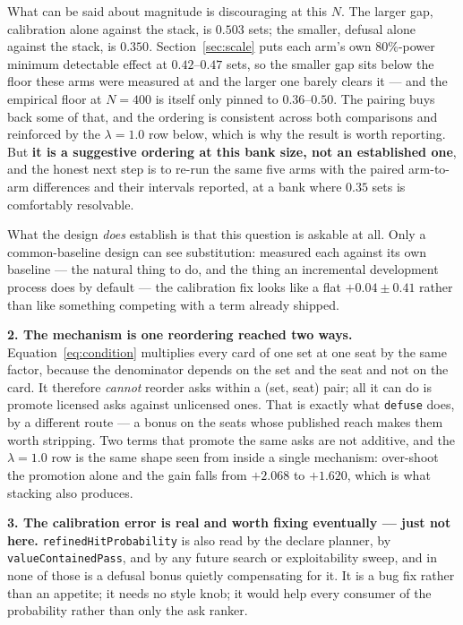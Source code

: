 \documentclass[11pt]{article}
\newcommand{\code}[1]{\texttt{#1}}
\begin{document}
What can be said about magnitude is discouraging at this $N$. The larger gap, calibration
alone against the stack, is $0.503$ sets; the smaller, defusal alone against the stack, is
$0.350$. Section~\ref{sec:scale} puts each arm's own $80\%$-power minimum detectable
effect at $0.42$--$0.47$ sets, so the smaller gap sits below the floor these arms were
measured at and the larger one barely clears it --- and the empirical floor at $N = 400$
is itself only pinned to $0.36$--$0.50$. The pairing buys back some of that, and the
ordering is consistent across both comparisons and reinforced by the $\lambda = 1.0$ row
below, which is why the result is worth reporting. But \textbf{it is a suggestive ordering
at this bank size, not an established one}, and the honest next step is to re-run the same
five arms with the paired arm-to-arm differences and their intervals reported, at a bank
where $0.35$ sets is comfortably resolvable.

What the design \emph{does} establish is that this question is askable at all. Only a
common-baseline design can see substitution: measured each against its own baseline --- the
natural thing to do, and the thing an incremental development process does by default ---
the calibration fix looks like a flat $+0.04 \pm 0.41$ rather than like something competing
with a term already shipped.

\textbf{2. The mechanism is one reordering reached two ways.} Equation~\eqref{eq:condition}
multiplies every card of one set at one seat by the same factor, because the denominator
depends on the set and the seat and not on the card. It therefore \emph{cannot} reorder
asks within a (set, seat) pair; all it can do is promote licensed asks against unlicensed
ones. That is exactly what \code{defuse} does, by a different route --- a bonus on the
seats whose published reach makes them worth stripping. Two terms that promote the same
asks are not additive, and the $\lambda = 1.0$ row is the same shape seen from inside a
single mechanism: over-shoot the promotion alone and the gain falls from $+2.068$ to
$+1.620$, which is what stacking also produces.

\textbf{3. The calibration error is real and worth fixing eventually --- just not here.}
\code{refinedHitProbability} is also read by the declare planner, by
\code{valueContainedPass}, and by any future search or exploitability sweep, and in none of
those is a defusal bonus quietly compensating for it. It is a bug fix rather than an
appetite; it needs no style knob; it would help every consumer of the probability rather
than only the ask ranker.
\end{document}
